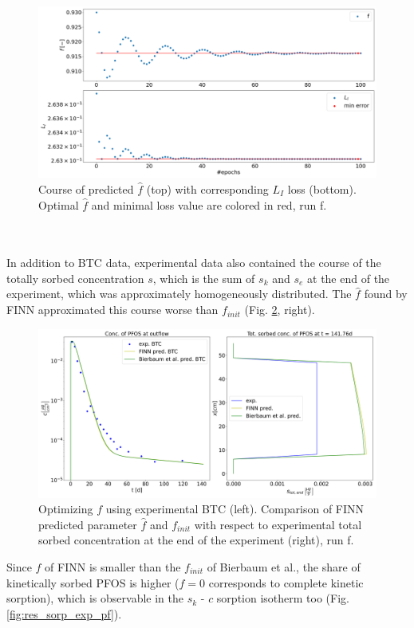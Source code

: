 \begin{figure}[h!]
	\centering
	\includegraphics[scale=0.29]{images/res_loss_exp_pf.png}
\caption[Loss, run f]{Course of predicted $\hat{f}$ (top) with corresponding $L_{I}$ loss (bottom). Optimal $\hat{f}$ and minimal loss value are colored in red, run f.}
\label{fig:res_loss_exp_pf}
\end{figure}\\
\\
In addition to BTC data, experimental data also contained the course of the totally sorbed concentration $s$, which is the sum of $s_k$ and $s_e$ at the end of the experiment, which was approximately homogeneously distributed. The $\hat{f}$ found by FINN approximated this course worse than $f_{init}$ (Fig. \ref{fig:res_btc_exp_pf_comp}, right).
\begin{figure}[h!]
	\centering
	\includegraphics[scale=0.29]{images/res_btc_exp_pf_comp.png}
\caption[FINN predicted BTC, run f]{Optimizing $f$ using experimental BTC (left). Comparison of FINN predicted parameter $\hat{f}$ and $f_{init}$ with respect to experimental total sorbed concentration at the end of the experiment (right), run f.}
\label{fig:res_btc_exp_pf_comp}
\end{figure}
Since $\hat{f}$ of FINN is smaller than the $f_{init}$ of Bierbaum et al., the share of kinetically sorbed PFOS is higher ($f=0$ corresponds to complete kinetic sorption), which is observable in the $s_k$ - $c$ sorption isotherm too (Fig. \ref{fig:res_sorp_exp_pf}).
